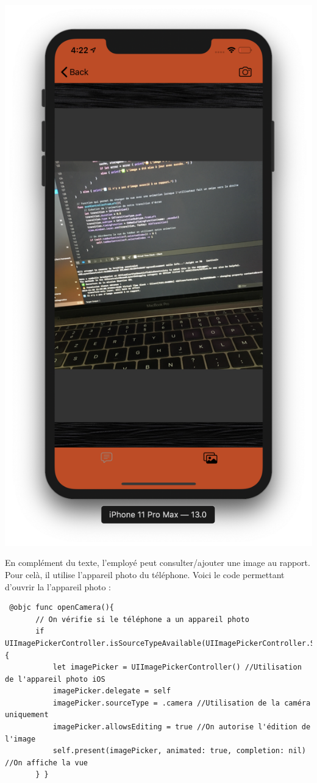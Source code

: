 \documentclass{article}
\begin{document}
\begin{center}
  	\includegraphics[scale=0.2]{ImageRapportIOS.png}
\end{center}
 
 En complément du texte, l'employé peut consulter/ajouter une image au rapport. Pour celà, il utilise l'appareil photo du téléphone. Voici le code permettant d'ouvrir la l'appareil photo :
 \begin{verbatim}
 @objc func openCamera(){
       // On vérifie si le téléphone a un appareil photo
       if UIImagePickerController.isSourceTypeAvailable(UIImagePickerController.SourceType.camera) { 
           let imagePicker = UIImagePickerController() //Utilisation de l'appareil photo iOS
           imagePicker.delegate = self
           imagePicker.sourceType = .camera //Utilisation de la caméra uniquement
           imagePicker.allowsEditing = true //On autorise l'édition de l'image
           self.present(imagePicker, animated: true, completion: nil) //On affiche la vue
       } }
 \end{verbatim}
 
\end{document}
